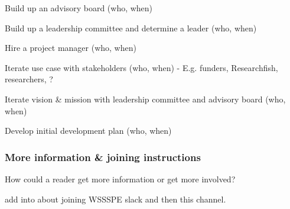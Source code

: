 Build up an advisory board (who, when)

Build up a leadership committee and determine a leader (who, when)

Hire a project manager (who, when)

Iterate use case with stakeholders (who, when)
- E.g. funders, Researchfish, researchers, ?

Iterate vision \& mission with leadership committee and advisory board (who, when)

Develop initial development plan (who, when)


\subsubsection{More information \& joining instructions}

How could a reader get more information or get more involved?

add into about joining WSSSPE slack and then this channel.